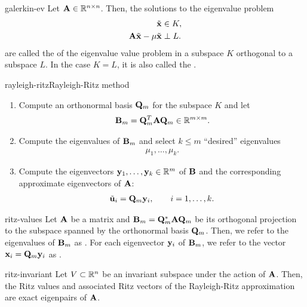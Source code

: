 \begin{Definition}{galerkin-ev}
  Let $\mathbf A\in\mathbb R^{n\times n}$. Then, the solutions to the eigenvalue problem
  \begin{align}
    \tilde{\mathbf x} &\in K,\\
    \mathbf A\tilde{\mathbf x} - \mu\tilde{\mathbf x}&\perp L.
  \end{align}
  are called the  of the eigenvalue value problem in a subspace $K$ orthogonal to a subspace
  $L$. In the case $K=L$, it is also called the .
\end{Definition}

\begin{Algorithm*}{rayleigh-ritz}{Rayleigh-Ritz method}
  \begin{enumerate}
  \item Compute an orthonormal basis $\mathbf Q_m$ for the subspace $K$ and let
    \begin{gather}
      \mathbf B_m = \mathbf Q_m^T\mathbf A\mathbf Q_m \in \mathbb R^{m\times m}.
    \end{gather}
  \item Compute the eigenvalues of $\mathbf B_m$ and select $k\le m$ ``desired'' eigenvalues
    \begin{gather}
      \mu_1, \dots,\mu_k.
    \end{gather}
  \item Compute the eigenvectors $\mathbf y_1,\dots,\mathbf y_k\in\mathbb R^m$ of $\mathbf B$
    and the corresponding approximate eigenvectors of $\mathbf A$:
    \begin{gather}
      \tilde{\mathbf u}_i = \mathbf Q_m \mathbf y_i,\qquad i=1,\dots,k.
    \end{gather}
  \end{enumerate}
\end{Algorithm*}

\begin{Definition}{ritz-values}
  Let $\mathbf A$ be a matrix and $\mathbf B_m = \mathbf Q_m^*\mathbf A\mathbf Q_m$ be its
  orthogonal projection to the subspace spanned by the orthonormal basis
  $\mathbf Q_m$. Then, we refer to the eigenvalues of $\mathbf B_m$ as
  .
  For each eigenvector $\mathbf y_i$ of $\mathbf B_m$, we refer to the vector
  $\mathbf x_i = \mathbf Q_m\mathbf y_i$ as .
\end{Definition}

\begin{Lemma}{ritz-invariant}
  Let $V\subset\mathbb R^n$ be an invariant subspace under the action of
  $\mathbf A$. Then, the Ritz values and associated Ritz vectors of the
  Rayleigh-Ritz approximation are exact eigenpairs of $\mathbf A$.
\end{Lemma}

